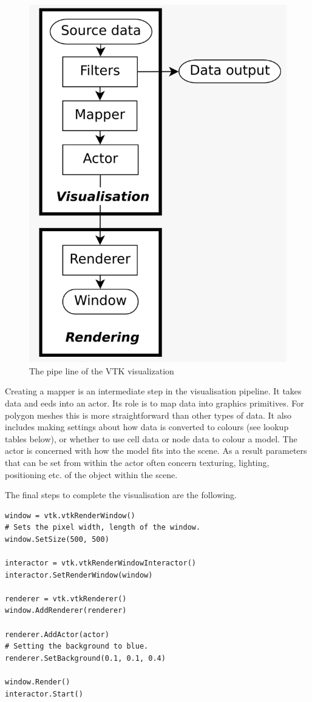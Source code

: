 \documentclass{article}
\begin{document}
\begin{figure}
\centering
\includegraphics[scale=0.6]{VTK pipe line.PNG}
\caption{The pipe line of the VTK visualization}
\label{fig:VTK pipe line}
\end{figure}


Creating a mapper is an intermediate step in the visualisation pipeline. It takes data and eeds into an actor. Its role is to map data into graphics primitives. For polygon meshes this is more straightforward than other types of data. It also includes making settings about how data is converted to colours (see lookup tables below), or whether to use cell data or node data to colour a model. The actor is concerned with how the model fits into the scene. As a result parameters that can be set from within the actor often concern texturing, lighting, positioning etc. of the object within the scene.

The final steps to complete the visualisation are the following.
\begin{verbatim}
window = vtk.vtkRenderWindow()
# Sets the pixel width, length of the window.
window.SetSize(500, 500)

interactor = vtk.vtkRenderWindowInteractor()
interactor.SetRenderWindow(window)

renderer = vtk.vtkRenderer()
window.AddRenderer(renderer)

renderer.AddActor(actor)
# Setting the background to blue.
renderer.SetBackground(0.1, 0.1, 0.4)

window.Render()
interactor.Start()
\end{verbatim}
\end{document}
